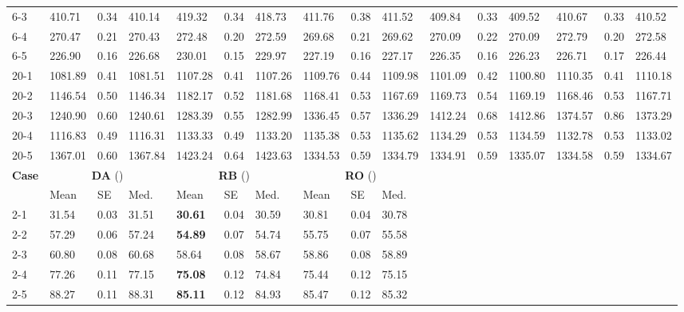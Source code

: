 \begin{table}[!htbp]
{\begin{tabular}{l *{5}{lll}}
6-3 & 410.71 & 0.34 & 410.14 & 419.32 & 0.34 & 418.73 & 411.76 & 0.38 & 411.52 & 409.84 & 0.33 & 409.52 & 410.67 & 0.33 & 410.52 \\
6-4 & 270.47 & 0.21 & 270.43 & 272.48 & 0.20 & 272.59 & 269.68 & 0.21 & 269.62 & 270.09 & 0.22 & 270.09 & 272.79 & 0.20 & 272.58 \\
6-5 & 226.90 & 0.16 & 226.68 & 230.01 & 0.15 & 229.97 & 227.19 & 0.16 & 227.17 & 226.35 & 0.16 & 226.23 & 226.71 & 0.17 & 226.44 \\
20-1 & 1081.89 & 0.41 & 1081.51 & 1107.28 & 0.41 & 1107.26 & 1109.76 & 0.44 & 1109.98 & 1101.09 & 0.42 & 1100.80 & 1110.35 & 0.41 & 1110.18 \\
20-2 & 1146.54 & 0.50 & 1146.34 & 1182.17 & 0.52 & 1181.68 & 1168.41 & 0.53 & 1167.69 & 1169.73 & 0.54 & 1169.19 & 1168.46 & 0.53 & 1167.71 \\
20-3 & 1240.90 & 0.60 & 1240.61 & 1283.39 & 0.55 & 1282.99 & 1336.45 & 0.57 & 1336.29 & 1412.24 & 0.68 & 1412.86 & 1374.57 & 0.86 & 1373.29 \\
20-4 & 1116.83 & 0.49 & 1116.31 & 1133.33 & 0.49 & 1133.20 & 1135.38 & 0.53 & 1135.62 & 1134.29 & 0.53 & 1134.59 & 1132.78 & 0.53 & 1133.02 \\
20-5 & 1367.01 & 0.60 & 1367.84 & 1423.24 & 0.64 & 1423.63 & 1334.53 & 0.59 & 1334.79 & 1334.91 & 0.59 & 1335.07 & 1334.58 & 0.59 & 1334.67 \\
\midrule
\multirow{2}{*}{\textbf{Case}}
& \multicolumn{3}{c}{\textbf{DA} (\citeauthor{rong2017heuristics})}
& \multicolumn{3}{c}{\textbf{RB} (\citeauthor{gallego2007bounds})}
& \multicolumn{3}{c}{\textbf{RO} (\citeauthor{rong2017heuristics})}
& \multicolumn{3}{c}{}
& \multicolumn{3}{c}{}
\\
\cmidrule(lr){2-4}\cmidrule(lr){5-7}\cmidrule(lr){8-10}
 & Mean & SE & Med. & Mean & SE & Med. & Mean & SE & Med. & & & & & &\\
\midrule
2-1 & 31.54 & 0.03 & 31.51 & \textbf{30.61} & 0.04 & 30.59 & 30.81 & 0.04 & 30.78 &  &  &  &  &  &  \\
2-2 & 57.29 & 0.06 & 57.24 & \textbf{54.89} & 0.07 & 54.74 & 55.75 & 0.07 & 55.58 &  &  &  &  &  &  \\
2-3 & 60.80 & 0.08 & 60.68 & 58.64 & 0.08 & 58.67 & 58.86 & 0.08 & 58.89 &  &  &  &  &  &  \\
2-4 & 77.26 & 0.11 & 77.15 & \textbf{75.08} & 0.12 & 74.84 & 75.44 & 0.12 & 75.15 &  &  &  &  &  &  \\
2-5 & 88.27 & 0.11 & 88.31 & \textbf{85.11} & 0.12 & 84.93 & 85.47 & 0.12 & 85.32 &  &  &  &  &  &  \\

\end{tabular}}
\end{table}
